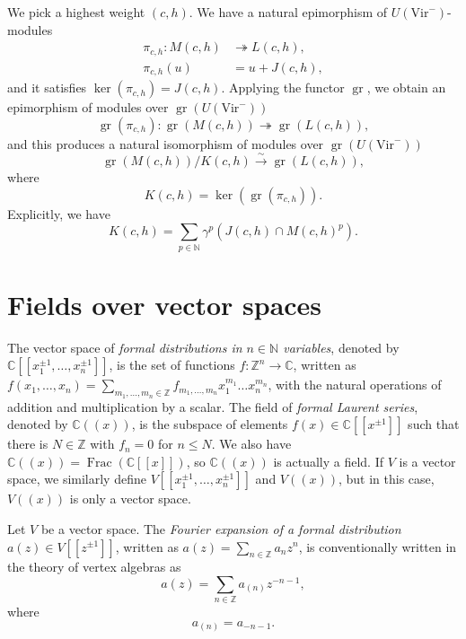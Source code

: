 \documentclass[a4paper, 12pt, reqno]{amsart}
\theoremstyle{remark}
\DeclareMathOperator{\gr}{gr}
\DeclareMathOperator{\Frac}{Frac}
\newcommand{\Vir}{{\mathrm{Vir}}}
\begin{document}
We pick a highest weight $(c, h)$.
We have a natural epimorphism of $U(\Vir^-)$-modules
\begin{align*}
  \pi_{c, h}: M(c, h) &\twoheadrightarrow L(c, h), \\
  \pi_{c, h}(u) &= u + J(c, h),
\end{align*}
and it satisfies $\ker(\pi_{c, h}) = J(c, h)$.
Applying the functor $\gr$, we obtain an epimorphism of modules over $\gr(U(\Vir^-))$
\begin{equation*}
  \gr(\pi_{c, h}): \gr(M(c, h)) \twoheadrightarrow \gr(L(c, h)),
\end{equation*}
and this produces a natural isomorphism of modules over $\gr(U(\Vir^-))$
\begin{equation*}
  \gr(M(c, h))/K(c, h) \xrightarrow{\sim} \gr(L(c, h)),
\end{equation*}
where
\begin{equation*}
  K(c, h) = \ker(\gr(\pi_{c, h})).
\end{equation*}
Explicitly, we have
\begin{equation}
  \label{eq:5}
  K(c, h) = \sum_{p \in \mathbb{N}}\gamma^p(J(c, h) \cap M(c, h)^p).
\end{equation}

\section{Fields over vector spaces}
\label{sec:fields-over-vector}

The vector space of \emph{formal distributions in $n \in \mathbb{N}$ variables}, denoted by $\mathbb{C}[[x_1^{\pm1}, \dots, x_n^{\pm1}]]$, is the set of functions $f: \mathbb{Z}^n \to \mathbb{C}$, written as $f(x_1, \dots, x_n) = \sum_{m_1, \dots, m_n \in \mathbb{Z}}f_{m_1, \dots, m_n}x_1^{m_1}\dots x_n^{m_n}$, with the natural operations of addition and multiplication by a scalar.
The field of \emph{formal Laurent series}, denoted by $\mathbb{C}((x))$, is the subspace of elements $f(x) \in \mathbb{C}[[x^{\pm1}]]$ such that there is $N \in \mathbb{Z}$ with $f_n = 0$ for $n \le N$.
We also have $\mathbb{C}((x)) = \Frac(\mathbb{C}[[x]])$, so $\mathbb{C}((x))$ is actually a field.
If $V$ is a vector space, we similarly define $V[[x_1^{\pm1}, \dots, x_n^{\pm1}]]$ and $V((x))$, but in this case, $V((x))$ is only a vector space.

Let $V$ be a vector space.
The \emph{Fourier expansion of a formal distribution $a(z) \in V[[z^{\pm1}]]$}, written as $a(z) = \sum_{n \in \mathbb{Z}}a_nz^n$, is conventionally written in the theory of vertex algebras as
\begin{equation*}
  a(z) = \sum_{n \in \mathbb{Z}}a_{(n)}z^{-n - 1},
\end{equation*}
where
\begin{equation*}
  a_{(n)} = a_{-n - 1}.
\end{equation*}
\end{document}
